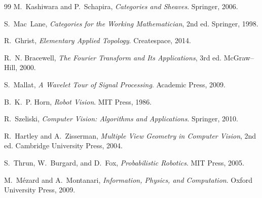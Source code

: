 \documentclass[12pt]{article}
\begin{document}
\begin{thebibliography}{99}
M.~Kashiwara and P.~Schapira,
\emph{Categories and Sheaves}.
Springer, 2006.

S.~Mac~Lane,
\emph{Categories for the Working Mathematician}, 2nd ed.
Springer, 1998.

R.~Ghrist,
\emph{Elementary Applied Topology}.
Createspace, 2014.

R.~N. Bracewell,
\emph{The Fourier Transform and Its Applications}, 3rd ed.
McGraw--Hill, 2000.

S.~Mallat,
\emph{A Wavelet Tour of Signal Processing}.
Academic Press, 2009.

B.~K.~P. Horn,
\emph{Robot Vision}.
MIT Press, 1986.

R.~Szeliski,
\emph{Computer Vision: Algorithms and Applications}.
Springer, 2010.

R.~Hartley and A.~Zisserman,
\emph{Multiple View Geometry in Computer Vision}, 2nd ed.
Cambridge University Press, 2004.

S.~Thrun, W.~Burgard, and D.~Fox,
\emph{Probabilistic Robotics}.
MIT Press, 2005.

M.~M{\'e}zard and A.~Montanari,
\emph{Information, Physics, and Computation}.
Oxford University Press, 2009.

\end{thebibliography}
\end{document}
